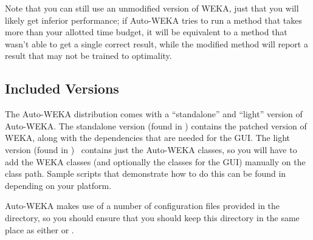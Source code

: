\begin{aside}
Note that you can still use an unmodified version of WEKA, just that you will likely get inferior performance; if Auto-WEKA tries to run a method that takes more than your allotted time budget, it will be equivalent to a method that wasn't able to get a single correct result, while the modified method will report a result that may not be trained to optimality. 
\end{aside}


\subsection{Included Versions}

The Auto-WEKA distribution comes with a ``standalone'' and ``light'' version of Auto-WEKA. The standalone version (found in ) contains the patched version of WEKA, along with the dependencies that are needed for the GUI. The light version (found in ) \ contains just the Auto-WEKA classes, so you will have to add the WEKA classes (and optionally the classes for the GUI) manually on the class path. Sample scripts that demonstrate how to do this can be found in  depending on your platform.

Auto-WEKA makes use of a number of configuration files provided in the  directory, so you should ensure that you should keep this directory in the same place as either  or .
